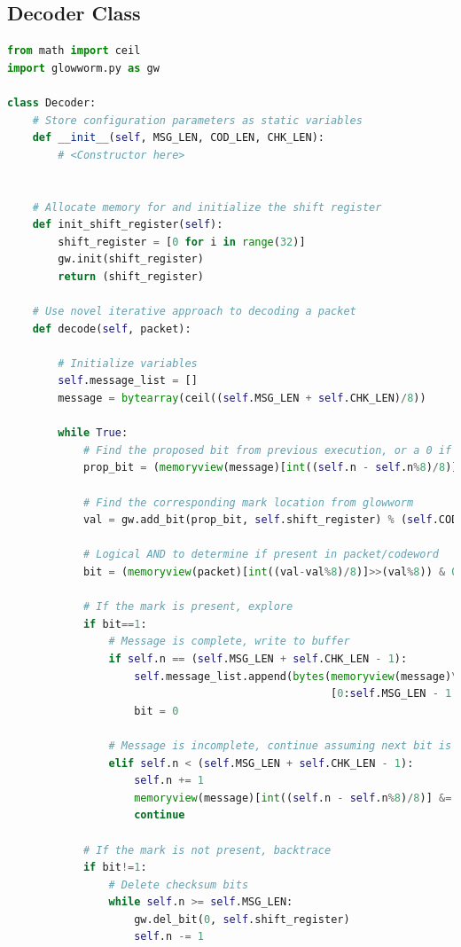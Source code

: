 \documentclass[conference]{IEEEtran}
\begin{document}
\newpage
\subsection{Decoder Class}
\label{PyDecoder}
\begin{lstlisting}[language=Python]
from math import ceil
import glowworm.py as gw

class Decoder:
    # Store configuration parameters as static variables
    def __init__(self, MSG_LEN, COD_LEN, CHK_LEN):
        # <Constructor here>


    # Allocate memory for and initialize the shift register
    def init_shift_register(self):
        shift_register = [0 for i in range(32)]
        gw.init(shift_register)
        return (shift_register)

    # Use novel iterative approach to decoding a packet
    def decode(self, packet):
    
        # Initialize variables
        self.message_list = []
        message = bytearray(ceil((self.MSG_LEN + self.CHK_LEN)/8))

        while True:
            # Find the proposed bit from previous execution, or a 0 if initial iteration
            prop_bit = (memoryview(message)[int((self.n - self.n%8)/8)]>>(self.n%8)) & 0b1
            
            # Find the corresponding mark location from glowworm
            val = gw.add_bit(prop_bit, self.shift_register) % (self.COD_LEN)
            
            # Logical AND to determine if present in packet/codeword
            bit = (memoryview(packet)[int((val-val%8)/8)]>>(val%8)) & 0b1

            # If the mark is present, explore
            if bit==1:
                # Message is complete, write to buffer
                if self.n == (self.MSG_LEN + self.CHK_LEN - 1):
                    self.message_list.append(bytes(memoryview(message)\
                                                   [0:self.MSG_LEN - 1 - self.CHK_LEN]))
                    bit = 0
                    
                # Message is incomplete, continue assuming next bit is 0
                elif self.n < (self.MSG_LEN + self.CHK_LEN - 1):
                    self.n += 1
                    memoryview(message)[int((self.n - self.n%8)/8)] &= (0xff ^ (1<<self.n%8))
                    continue
                    
            # If the mark is not present, backtrace
            if bit!=1:
                # Delete checksum bits
                while self.n >= self.MSG_LEN: 
                    gw.del_bit(0, self.shift_register)
                    self.n -= 1
                    

\end{lstlisting}
\end{document}
